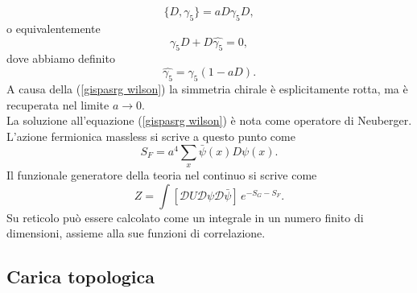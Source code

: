 \documentclass{article}
\numberwithin{equation}{subsection}
\begin{document}
\begin{equation}
    \label{gispasrg wilson}
    \{D, \gamma_5\}=aD\gamma_5D,
\end{equation}
o equivalentemente
\begin{equation}
    \gamma_5D+D\hat{\gamma_5}=0,
\end{equation}
dove abbiamo definito 
\begin{equation}
    \label{gamma5 hat}
    \hat{\gamma_5}=\gamma_5(1-aD).
\end{equation}
A causa della (\ref{gispasrg wilson}) la simmetria chirale è esplicitamente rotta, ma è recuperata nel limite $a\rightarrow 0$.\\La soluzione all'equazione (\ref{gispasrg wilson}) è nota come operatore di Neuberger.\\
L'azione fermionica massless si scrive a questo punto come 
\begin{equation}
    \label{SF su reticolo}
    S_F=a^4\sum_x \bar{\psi}(x)D\psi(x).
\end{equation}
Il funzionale generatore della teoria nel continuo si scrive come 
\begin{equation}
    \label{funzionale}
    Z=\int \left[\mathcal{D}U \mathcal{D}\psi \mathcal{D}\bar{\psi}\right] \, e^{-S_G-S_F}.
\end{equation}
Su reticolo può essere calcolato come un integrale in un numero finito di dimensioni, assieme alla sue funzioni di correlazione. 

\subsection{Carica topologica}
\end{document}
